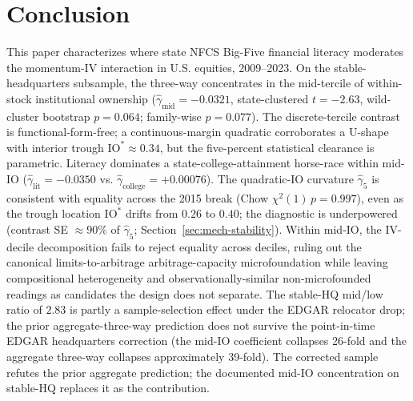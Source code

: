 \section{Conclusion}

This paper characterizes where state NFCS Big-Five financial literacy moderates the momentum-IV interaction in U.S. equities, 2009--2023. On the stable-headquarters subsample, the three-way concentrates in the mid-tercile of within-stock institutional ownership ($\hat\gamma_{\text{mid}} = -0.0321$, state-clustered $t = -2.63$, wild-cluster bootstrap $p = 0.064$; family-wise $p = 0.077$). The discrete-tercile contrast is functional-form-free; a continuous-margin quadratic corroborates a U-shape with interior trough $\mathrm{IO}^{\ast} \approx 0.34$, but the five-percent statistical clearance is parametric. Literacy dominates a state-college-attainment horse-race within mid-IO ($\hat\gamma_{\text{lit}} = -0.0350$ vs. $\hat\gamma_{\text{college}} = +0.00076$). The quadratic-IO curvature $\hat\gamma_{5}$ is consistent with equality across the 2015 break (Chow $\chi^{2}(1)\,p = 0.997$), even as the trough location $\mathrm{IO}^{\ast}$ drifts from $0.26$ to $0.40$; the diagnostic is underpowered (contrast SE $\approx 90\%$ of $\hat\gamma_{5}$; Section~\ref{sec:mech-stability}). Within mid-IO, the IV-decile decomposition fails to reject equality across deciles, ruling out the canonical limits-to-arbitrage arbitrage-capacity microfoundation while leaving compositional heterogeneity and observationally-similar non-microfounded readings as candidates the design does not separate. The stable-HQ mid/low ratio of $2.83$ is partly a sample-selection effect under the EDGAR relocator drop; the prior aggregate-three-way prediction does not survive the point-in-time EDGAR headquarters correction (the mid-IO coefficient collapses 26-fold and the aggregate three-way collapses approximately 39-fold). The corrected sample refutes the prior aggregate prediction; the documented mid-IO concentration on stable-HQ replaces it as the contribution.
